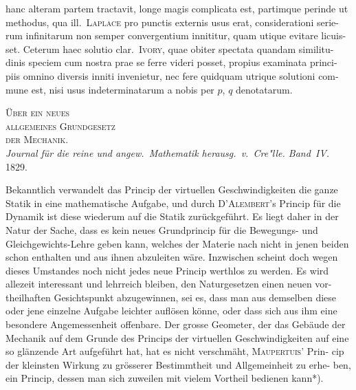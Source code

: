 \documentclass[12pt,a4paper]{article}
\theoremstyle{gauss}
\begin{document}
\newpage
\setcounter{page}{28}

hanc alteram partem tractavit, longe magis complicata est, partimque perinde
ut methodus, qua ill.~\textsc{Laplace} pro punctis externis usus erat, considerationi serie-
rum infinitarum non semper convergentium innititur, quam utique evitare licuis-
set. Ceterum haec solutio clar.~\textsc{Ivory}, quae obiter spectata quandam similitu-
dinis speciem cum nostra prae se ferre videri posset, propius examinata princi-
piis omnino diversis inniti invenietur, nec fere quidquam utrique solutioni com-
mune est, nisi usus indeterminatarum a nobis per $p$, $q$ denotatarum.

\vspace{24pt}

\begin{center}
\Large\textsc{\"Uber ein neues}\\[4pt]
\Large\textsc{allgemeines Grundgesetz}\\[4pt]
\Large\textsc{der Mechanik.}\\[12pt]
\small\textit{Journal f\"ur die reine und angew.~Mathematik herausg.~v.~Cre"{}lle. Band~IV.}\\
\textsc{1829.}
\end{center}

\vspace{12pt}

Bekanntlich verwandelt das Princip der virtuellen Geschwindigkeiten die
ganze Statik in eine mathematische Aufgabe, und durch \textsc{D'Alembert}'s Princip f\"ur
die Dynamik ist diese wiederum auf die Statik zur\"uckgef\"uhrt. Es liegt daher in
der Natur der Sache, dass es kein neues Grundprincip f\"ur die Bewegungs- und
Gleichgewichts-Lehre geben kann, welches der Materie nach nicht in jenen beiden
schon enthalten und aus ihnen abzuleiten w\"are. Inzwischen scheint doch wegen
dieses Umstandes noch nicht jedes neue Princip werthlos zu werden. Es wird
allezeit interessant und lehrreich bleiben, den Naturgesetzen einen neuen vor-
theilhaften Gesichtspunkt abzugewinnen, sei es, dass man aus demselben diese
oder jene einzelne Aufgabe leichter aufl\"osen k\"onne, oder dass sich aus ihm eine
besondere Angemessenheit offenbare. Der grosse Geometer, der das Geb\"aude der
Mechanik auf dem Grunde des Princips der virtuellen Geschwindigkeiten auf
eine so gl\"anzende Art aufgef\"uhrt hat, hat es nicht verschm\"aht, \textsc{Maupertuis}' Prin-
cip der kleinsten Wirkung zu gr\"osserer Bestimmtheit und Allgemeinheit zu erhe-
ben, ein Princip, dessen man sich zuweilen mit vielem Vortheil bedienen kann*).
\end{document}

